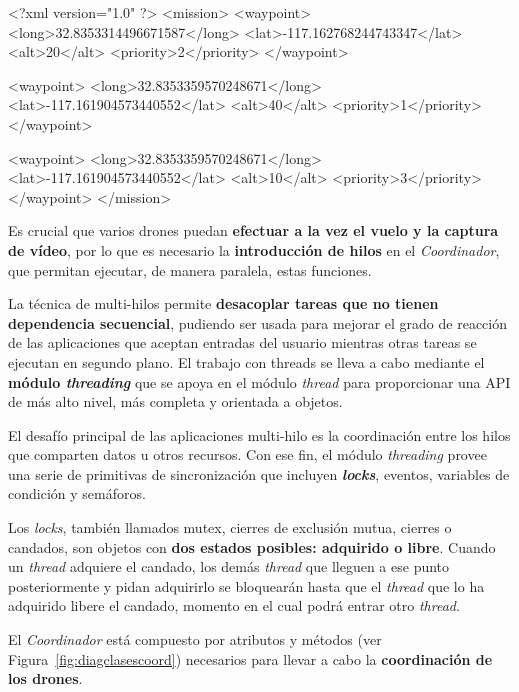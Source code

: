 \begin{listing}[
 float=,
 language = XML,
 caption = {Ejemplo de archivo XML que contiene la información de los «waypoints»},
 label  = code:archivoxml]
<?xml version="1.0" ?>
<mission>
	<waypoint>
 		<long>32.8353314496671587</long>
 		<lat>-117.162768244743347</lat>
		<alt>20</alt>
		<priority>2</priority>
	</waypoint>

	<waypoint>
 		<long>32.8353359570248671</long>
 		<lat>-117.161904573440552</lat>
		<alt>40</alt>
		<priority>1</priority>
	</waypoint>

	<waypoint>
 		<long>32.8353359570248671</long>
 		<lat>-117.161904573440552</lat>
		<alt>10</alt>
		<priority>3</priority>
	</waypoint>
</mission>
\end{listing}


Es crucial que varios drones puedan \textbf{efectuar a la vez el vuelo y la captura de vídeo}, por lo que es necesario la \textbf{introducción de hilos} en el \textit{Coordinador}, que permitan ejecutar, de manera paralela, estas funciones. 

La técnica de multi-hilos permite \textbf{desacoplar tareas que no tienen dependencia secuencial}, pudiendo ser usada para mejorar el grado de reacción de las aplicaciones que aceptan entradas del usuario mientras otras tareas se ejecutan en segundo plano. El trabajo con threads se lleva a cabo mediante el \textbf{módulo \textit{threading}} que se apoya en el módulo \textit{thread} para proporcionar una \acs{API} de más alto nivel, más completa y orientada a objetos. 

El desafío principal de las aplicaciones multi-hilo es la coordinación entre los hilos que comparten datos u otros recursos. Con ese fin, el módulo \textit{threading} provee una serie de primitivas de sincronización que incluyen \textbf{\textit{locks}}, eventos, variables de condición y semáforos. 

Los \textit{locks}, también llamados mutex, cierres de exclusión mutua, cierres o candados, son objetos con \textbf{dos estados posibles: adquirido o libre}. Cuando un \textit{thread} adquiere el candado, los demás \textit{thread} que lleguen a ese punto posteriormente y pidan adquirirlo se bloquearán hasta que el \textit{thread} que lo ha adquirido libere el candado, momento en el cual podrá entrar otro \textit{thread}.

El \textit{Coordinador} está compuesto por atributos y métodos (ver Figura~\ref{fig:diagclasescoord}) necesarios para llevar a cabo la \textbf{coordinación de los drones}.

